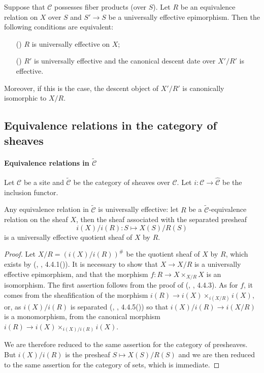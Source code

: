 \begin{corollary}\label{category equivalence relation universally effective and descent}
Suppose that $\mathcal{C}$ possesses fiber products (over $S$). Let $R$ be an equivalence relation on $X$ over $S$ and $S'\to S$ be a universally effective epimorphism. Then the following conditions are equivalent:
\begin{enumerate}
    \item[(\rmnum{1})] $R$ is universally effective on $X$;
    \item[(\rmnum{2})] $R'$ is universally effective and the canonical descent date over $X'/R'$ is effective.
\end{enumerate}
Moreover, if this is the case, the descent object of $X'/R'$ is canonically isomorphic to $X/R$.
\end{corollary}

\subsection{Equivalence relations in the category of sheaves}

\paragraph{Equivalence relations in \texorpdfstring{$\widetilde{\mathcal{C}}$}{C}}

Let $\mathcal{C}$ be a site and $\widetilde{\mathcal{C}}$ be the category of sheaves over $\mathcal{C}$. Let $i:\mathcal{C}\to\widehat{\mathcal{C}}$ be the inclusion functor.

\begin{proposition}\label{site sheaf equivalence relation is universally effective}
Any equivalence relation in $\widetilde{\mathcal{C}}$ is universally effective: let $R$ be a $\widetilde{\mathcal{C}}$-equivalence relation on the sheaf $X$, then the sheaf associated with the separated presheaf
\[i(X)/i(R):S\mapsto X(S)/R(S)\]
is a universally effective quotient sheaf of $X$ by $R$.
\end{proposition}
\begin{proof}
Let $X/R=(i(X)/i(R))^\#$ be the quotient sheaf of $X$ by $R$, which exists by (\cite{SGA3-1}, , 4.4.1()). It is necessary to show that $X\to X/R$ is a universally effective epimorphism, and that the morphism $f:R\to X\times_{X/R}X$ is an isomorphism. The first assertion follows from the proof of (\cite{SGA3-1}, , 4.4.3). As for $f$, it comes from the sheafification of the morphism $i(R)\to i(X)\times_{i(X/R)}i(X)$, or, as $i(X)/i(R)$ is separated (\cite{SGA3-1}, , 4.4.5()) so that $i(X)/i(R)\to i(X/R)$ is a monomorphism, from the canonical morphism $i(R)\to i(X)\times_{i(X)/i(R)}i(X)$.\par
We are therefore reduced to the same assertion for the category of presheaves. But $i(X)/i(R)$ is the presheaf $S\mapsto X(S)/R(S)$ and we are then reduced to the same assertion for the category of sets, which is immediate.
\end{proof}

